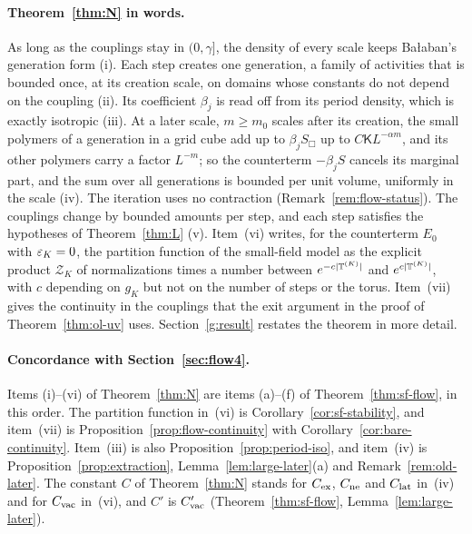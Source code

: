 \paragraph{Theorem~\ref{thm:N} in words.} As long as the couplings stay in $(0,\gamma]$, the density of every scale keeps Ba\l aban's generation form (i). Each step creates one generation, a family of activities that is bounded once, at its creation scale, on domains whose constants do not depend on the coupling (ii). Its coefficient $\beta_j$ is read off from its period density, which is exactly isotropic (iii). At a later scale, $m\ge m_0$ scales after its creation, the small polymers of a generation in a grid cube add up to $\beta_jS_\Box$ up to $C\mathsf KL^{-\alpha m}$, and its other polymers carry a factor $L^{-m}$; so the counterterm $-\beta_jS$ cancels its marginal part, and the sum over all generations is bounded per unit volume, uniformly in the scale (iv). The iteration uses no contraction (Remark~\ref{rem:flow-status}). The couplings change by bounded amounts per step, and each step satisfies the hypotheses of Theorem~\ref{thm:L} (v). Item~(vi) writes, for the counterterm $E_0$ with $\varepsilon_K=0$, the partition function of the small-field model as the explicit product $\mathcal Z_K$ of normalizations times a number between $e^{-c|\mathbb T^{(K)}|}$ and $e^{c|\mathbb T^{(K)}|}$, with $c$ depending on $g_K$ but not on the number of steps or the torus. Item~(vii) gives the continuity in the couplings that the exit argument in the proof of Theorem~\ref{thm:ol-uv} uses. Section~\ref{g:result} restates the theorem in more detail.

\paragraph{Concordance with Section~\ref{sec:flow4}.} Items (i)--(vi) of Theorem~\ref{thm:N} are items (a)--(f) of Theorem~\ref{thm:sf-flow}, in this order. The partition function in~(vi) is Corollary~\ref{cor:sf-stability}, and item~(vii) is Proposition~\ref{prop:flow-continuity} with Corollary~\ref{cor:bare-continuity}. Item~(iii) is also Proposition~\ref{prop:period-iso}, and item~(iv) is Proposition~\ref{prop:extraction}, Lemma~\ref{lem:large-later}(a) and Remark~\ref{rem:old-later}. The constant $C$ of Theorem~\ref{thm:N} stands for $C_{\rm ex}$, $C_{\rm ne}$ and $C_{\rm lat}$ in~(iv) and for $C_{\rm vac}$ in~(vi), and $C'$ is $C'_{\rm vac}$ (Theorem~\ref{thm:sf-flow}, Lemma~\ref{lem:large-later}).

